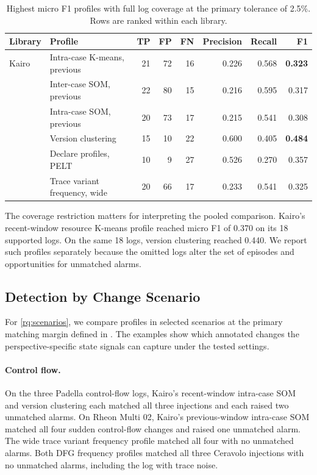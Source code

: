 \begin{table}[!t]
\caption{Highest micro F1 profiles with full log coverage at the primary tolerance of 2.5\%. Rows are ranked within each library.}
\label{tab:assessment-main-results}
\centering
\small
\begin{tabularx}{\textwidth}{@{}l>{\raggedright\arraybackslash}Xrrrrrr@{}}
\toprule
\textbf{Library} & \textbf{Profile} & \textbf{TP} & \textbf{FP} & \textbf{FN} & \textbf{Precision} & \textbf{Recall} & \textbf{F1} \\
\midrule
Kairo & Intra-case K-means, previous & 21 & 72 & 16 & 0.226 & 0.568 & \textbf{0.323} \\
& Inter-case SOM, previous & 22 & 80 & 15 & 0.216 & 0.595 & 0.317 \\
& Intra-case SOM, previous & 20 & 73 & 17 & 0.215 & 0.541 & 0.308 \\
\softwarepm{} & Version clustering & 15 & 10 & 22 & 0.600 & 0.405 & \textbf{0.484} \\
& Declare profiles, PELT & 10 & 9 & 27 & 0.526 & 0.270 & 0.357 \\
& Trace variant frequency, wide & 20 & 66 & 17 & 0.233 & 0.541 & 0.325 \\
\bottomrule
\end{tabularx}
\end{table}

The coverage restriction matters for interpreting the pooled comparison. Kairo's recent-window resource K-means profile reached micro F1 of 0.370 on its 18 supported logs. On the same 18 logs, version clustering reached 0.440. We report such profiles separately because the omitted logs alter the set of episodes and opportunities for unmatched alarms.

\subsection{Detection by Change Scenario}
\label{sec:assessment-scenarios}

For \ref*{rq:scenarios}, we compare profiles in selected scenarios at the primary matching margin defined in . The examples show which annotated changes the perspective-specific state signals can capture under the tested settings.

\paragraph{Control flow.}
On the three Padella control-flow logs, Kairo's recent-window intra-case SOM and \softwarepm{} version clustering each matched all three injections and each raised two unmatched alarms. On Rheon Multi 02, Kairo's previous-window intra-case SOM matched all four sudden control-flow changes and raised one unmatched alarm. The wide trace variant frequency profile matched all four with no unmatched alarms. Both DFG frequency profiles matched all three Ceravolo injections with no unmatched alarms, including the log with trace noise.

